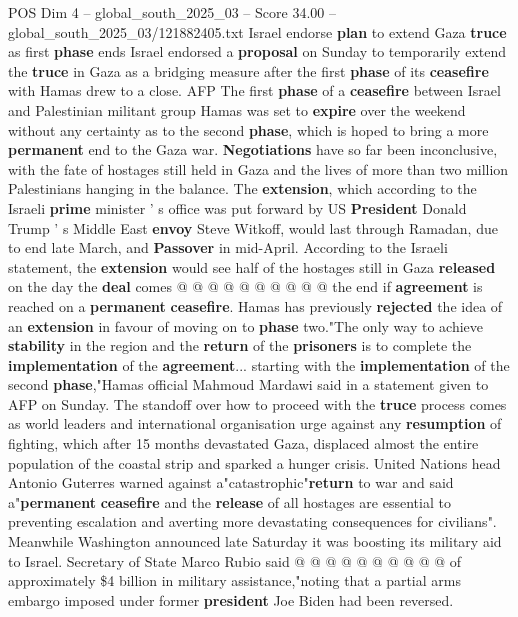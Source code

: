 \begin{textsample}{POS Dim 4 – global\_south\_2025\_03 – Score 34.00 – global\_south\_2025\_03/121882405.txt}  \label{ex:f4_pos_032}
Israel endorse \textbf{plan} to extend Gaza \textbf{truce} as first \textbf{phase} ends Israel endorsed a \textbf{proposal} on Sunday to temporarily extend the \textbf{truce} in Gaza as a bridging measure after the first \textbf{phase} of its \textbf{ceasefire} with Hamas drew to a close.
AFP The first \textbf{phase} of a \textbf{ceasefire} between Israel and Palestinian militant group Hamas was set to \textbf{expire} over the weekend without any certainty as to the second \textbf{phase}, which is hoped to bring a more \textbf{permanent} end to the Gaza war. \textbf{Negotiations} have so far been inconclusive, with the fate of hostages still held in Gaza and the lives of more than two million Palestinians hanging in the balance.
The \textbf{extension}, which according to the Israeli \textbf{prime} minister ' s office was put forward by US \textbf{President} Donald Trump ' s Middle East \textbf{envoy} Steve Witkoff, would last through Ramadan, due to end late March, and \textbf{Passover} in mid-April.
According to the Israeli statement, the \textbf{extension} would see half of the hostages still in Gaza \textbf{released} on the day the \textbf{deal} comes @ @ @ @ @ @ @ @ @ @ the end if \textbf{agreement} is reached on a \textbf{permanent} \textbf{ceasefire}.
Hamas has previously \textbf{rejected} the idea of an \textbf{extension} in favour of moving on to \textbf{phase} two."The only way to achieve \textbf{stability} in the region and the \textbf{return} of the \textbf{prisoners} is to complete the \textbf{implementation} of the \textbf{agreement}... starting with the \textbf{implementation} of the second \textbf{phase},"Hamas official Mahmoud Mardawi said in a statement given to AFP on Sunday.
The standoff over how to proceed with the \textbf{truce} process comes as world leaders and international organisation urge against any \textbf{resumption} of fighting, which after 15 months devastated Gaza, displaced almost the entire population of the coastal strip and sparked a hunger crisis.
United Nations head Antonio Guterres warned against a"catastrophic"\textbf{return} to war and said a"\textbf{permanent} \textbf{ceasefire} and the \textbf{release} of all hostages are essential to preventing escalation and averting more devastating consequences for civilians".
Meanwhile Washington announced late Saturday it was boosting its military aid to Israel.
Secretary of State Marco Rubio said @ @ @ @ @ @ @ @ @ @ of approximately \$4 billion in military assistance,"noting that a partial arms embargo imposed under former \textbf{president} Joe Biden had been reversed.

\end{textsample}
